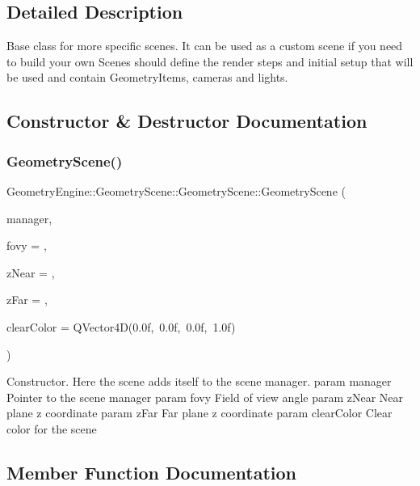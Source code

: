 \subsection{Detailed Description}
Base class for more specific scenes. It can be used as a custom scene if you need to build your own Scenes should define the render steps and initial setup that will be used and contain Geometry\+Items, cameras and lights. 

\subsection{Constructor \& Destructor Documentation}
\mbox{\label{class_geometry_engine_1_1_geometry_scene_1_1_geometry_scene_a238916b6237ec6b280541e48604955ca}} 
\subsubsection{\texorpdfstring{GeometryScene()}{GeometryScene()}}
{\footnotesize\ttfamily Geometry\+Engine\+::\+Geometry\+Scene\+::\+Geometry\+Scene\+::\+Geometry\+Scene (\begin{DoxyParamCaption}\item[{\mbox{\hyperlink{class_geometry_engine_1_1_scene_manager}{Scene\+Manager}} $\ast$}]{manager,  }\item[{G\+Ldouble}]{fovy = {},  }\item[{G\+Ldouble}]{z\+Near = {},  }\item[{G\+Ldouble}]{z\+Far = {},  }\item[{Q\+Vector4D}]{clear\+Color = {\ttfamily QVector4D(0.0f,~0.0f,~0.0f,~1.0f)} }\end{DoxyParamCaption})}

Constructor. Here the scene adds itself to the scene manager. param manager Pointer to the scene manager param fovy Field of view angle param z\+Near Near plane z coordinate param z\+Far Far plane z coordinate param clear\+Color Clear color for the scene 

\subsection{Member Function Documentation}
\mbox{\label{class_geometry_engine_1_1_geometry_scene_1_1_geometry_scene_af93678aaffba19dfb2302a9b2850ae59}} 
